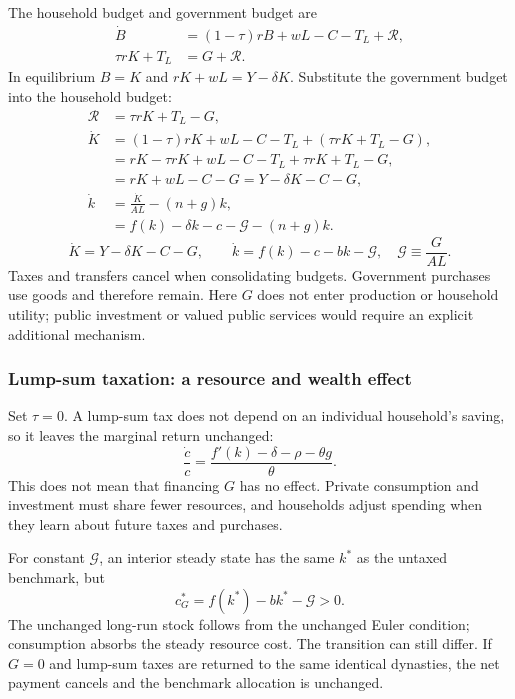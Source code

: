 The household budget and government budget are
\begin{align}
\dot B&=(1-\tau)rB+wL-C-T_L+\mathcal R,\\
\tau rK+T_L&=G+\mathcal R.
\end{align}
In equilibrium $B=K$ and $rK+wL=Y-\delta K$. Substitute the government budget
into the household budget:
\begin{align}
\mathcal R&=\tau rK+T_L-G,\\
\dot K&=(1-\tau)rK+wL-C-T_L+(\tau rK+T_L-G),\\
 &=rK-\tau rK+wL-C-T_L+\tau rK+T_L-G,\\
 &=rK+wL-C-G=Y-\delta K-C-G,\\
\dot k&=\frac{\dot K}{AL}-(n+g)k,\\
 &=f(k)-\delta k-c-\mathcal G-(n+g)k.
\end{align}
\begin{equation}\label{eq:ramsey-government-resources}
\dot K=Y-\delta K-C-G,
\qquad
\dot k=f(k)-c-bk-\mathcal G,
\quad \mathcal G\equiv\frac{G}{AL}.
\end{equation}
Taxes and transfers cancel when consolidating budgets. Government purchases
use goods and therefore remain. Here $G$ does not enter production or household
utility; public investment or valued public services would require an explicit
additional mechanism.

\subsubsection{Lump-sum taxation: a resource and wealth effect}

Set $\tau=0$. A lump-sum tax does not depend on an individual household's saving,
so it leaves the marginal return unchanged:
\begin{equation}
\frac{\dot c}{c}=\frac{f'(k)-\delta-\rho-\theta g}{\theta}.
\end{equation}
This does not mean that financing $G$ has no effect. Private consumption and
investment must share fewer resources, and households adjust spending when
they learn about future taxes and purchases.

For constant $\mathcal G$, an interior steady state has the same $k^*$ as the
untaxed benchmark, but
\begin{equation}
c^*_{G}=f(k^*)-bk^*-\mathcal G>0.
\end{equation}
The unchanged long-run stock follows from the unchanged Euler condition;
consumption absorbs the steady resource cost. The transition can still differ.
If $G=0$ and lump-sum taxes are returned to the same identical dynasties, the
net payment cancels and the benchmark allocation is unchanged.

